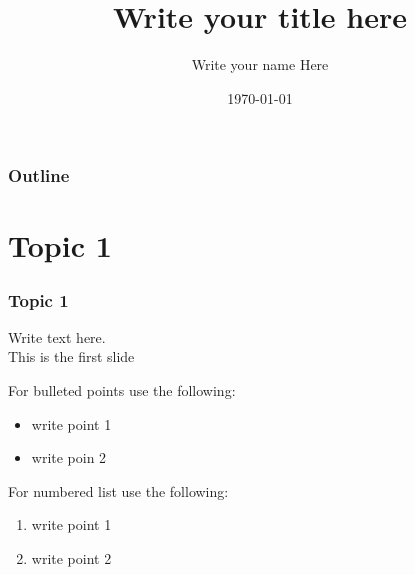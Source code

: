 \documentclass[12pt,xcolor=dvipsnames]{beamer}
\title{Write your title here}
\author{Write your name Here}
\date{\today}
\begin{document}
\begin{frame}
\titlepage
\end{frame}


\begin{frame}
\frametitle{Outline}
\begin{multicols}{2}
\tableofcontents[hideallsubsections]
\end{multicols}
\end{frame}

\section{Topic 1}
\begin{frame}[t]
\frametitle{Topic 1}
Write text here. \\
This is the first slide

For bulleted points use the following:\\
\begin{itemize}
 \item write point 1
 \item write poin 2
\end{itemize}

For numbered list use the following:\\
\begin{enumerate}
 \item write point 1
 \item write point 2
\end{enumerate}

\end{frame}

\end{document}
